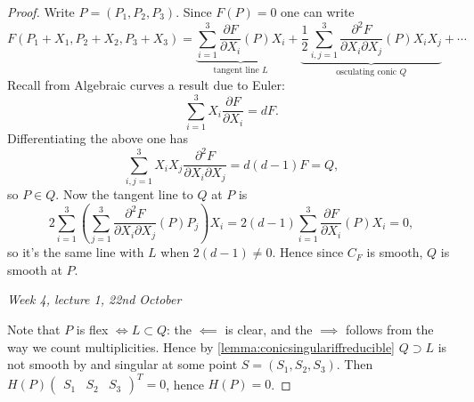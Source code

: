 \documentclass{article}
\theoremstyle{definition}
\begin{document}
\begin{proof}
Write $P=(P_1,P_2,P_3)$. Since $F(P)=0$ one can write
\[
F(P_1+X_1,P_2+X_2,P_3+X_3)=\underbrace{\sum_{i=1}^3\frac{\partial F}{\partial X_i}(P)X_i}_{\text{tangent line }L}+\underbrace{\frac12\sum_{i,j=1}^3\frac{\partial^2 F}{\partial X_i\partial X_j}(P)X_iX_j}_{\text{osculating conic }Q}+\cdots
\]
Recall from Algebraic curves a result due to Euler:
\[
\sum_{i=1}^3 X_i\frac{\partial F}{\partial X_i}=dF.
\]
Differentiating the above one has
\[
\sum_{i,j=1}^3X_iX_j\frac{\partial^2 F}{\partial X_i\partial X_j}=d(d-1)F=Q,
\]
so $P\in Q$. Now the tangent line to $Q$ at $P$ is
\[
2\sum_{i=1}^3\left(\sum_{j=1}^3\frac{\partial^2 F}{\partial X_i\partial X_j}(P)P_j\right)X_i=2(d-1)\sum_{i=1}^3\frac{\partial F}{\partial X_i}(P)X_i=0,
\]
so it's the same line with $L$ when $2(d-1)\neq 0$. Hence since $C_F$ is smooth, $Q$ is smooth at $P$.

\begin{flushright}
\textit{Week 4, lecture 1, 22nd October}
\end{flushright}

Note that $P$ is flex $\iff L\subset Q$: the $\impliedby$ is clear, and the $\implies$ follows from the way we count multiplicities. Hence by \ref{lemma:conicsingulariffreducible} $Q\supset L$ is not smooth by and singular at some point $S=(S_1,S_2,S_3)$. Then $H(P)\begin{pmatrix}S_1 & S_2 & S_3\end{pmatrix}^T=0$, hence $H(P)=0$.
\end{proof}
\end{document}
